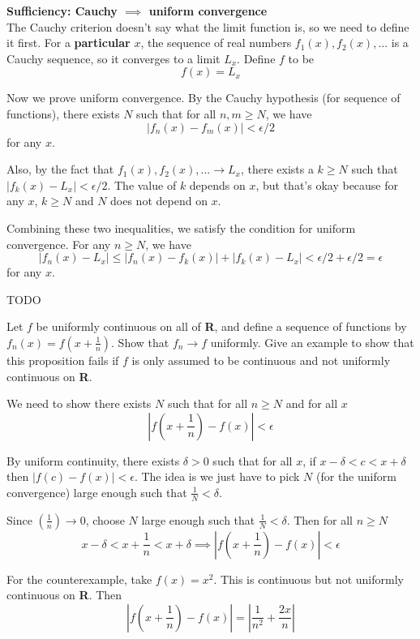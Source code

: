 \documentclass{oxmathproblems}
\begin{document}
\begin{questions}
\begin{solution}
  \textbf{Sufficiency: Cauchy $\implies$ uniform convergence}\\
  The Cauchy criterion doesn't say what the limit function is, so we need to define it first. For a \textbf{particular} $x$, the sequence of real numbers
  $f_{1}(x), f_{2}(x), ...$ is a Cauchy sequence, so it converges to a limit $L_{x}$. Define $f$ to be
  \[f(x)=L_{x}\]

  Now we prove uniform convergence. By the Cauchy hypothesis (for sequence of functions), there exists $N$ such that for all $n, m \geq N$, we have
  \[|f_{n}(x)-f_{m}(x)| < \epsilon/2\]
  for any $x$.

  Also, by the fact that $f_{1}(x), f_{2}(x), ... \to L_{x}$, there exists a $k \geq N$ such that $|f_{k}(x)-L_{x}| < \epsilon/2$.
  The value of $k$ depends on $x$, but that's okay because for any $x$, $k \geq N$ and $N$ does not depend on $x$.

  Combining these two inequalities, we satisfy the condition for uniform convergence. For any $n \geq N$, we have
  \[|f_{n}(x)-L_{x}| \leq |f_{n}(x)-f_{k}(x)| + |f_{k}(x)-L_{x}| < \epsilon/2 + \epsilon/2 = \epsilon\]
  for any $x$.
\end{solution}

\miquestion TODO

\miquestion Let $f$ be uniformly continuous on all of \textbf{R}, and define a sequence of functions by $f_{n}(x)=f(x+\frac{1}{n})$. Show that $f_{n} \to f$ uniformly.
Give an example to show that this proposition fails if $f$ is only assumed to be continuous and not uniformly continuous on \textbf{R}.
\begin{solution}
  We need to show there exists $N$ such that for all $n \geq N$ and for all $x$
  \[\left|f(x+\frac{1}{n})-f(x)\right| < \epsilon\]

  By uniform continuity, there exists $\delta > 0$ such that for all $x$, if $x-\delta < c < x+\delta$ then $|f(c)-f(x)| < \epsilon$.
  The idea is we just have to pick $N$ (for the uniform convergence) large enough such that $\frac{1}{N} < \delta$.

  Since $(\frac{1}{n}) \to 0$, choose $N$ large enough such that $\frac{1}{N} < \delta$. Then for all $n \geq N$
  \[x-\delta < x+\frac{1}{n} < x + \delta \implies \left|f(x+\frac{1}{n})-f(x)\right| < \epsilon\]

  For the counterexample, take $f(x)=x^2$. This is continuous but not uniformly continuous on \textbf{R}. Then
  \[\left|f(x+\frac{1}{n})-f(x)\right| = \left|\frac{1}{n^2} + \frac{2x}{n}\right|\]


\end{solution}
\end{questions}
\end{document}
